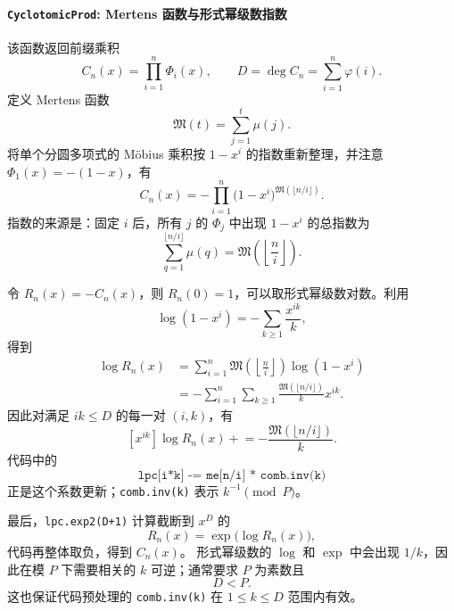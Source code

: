 \paragraph*{\texttt{CyclotomicProd}: Mertens 函数与形式幂级数指数}

该函数返回前缀乘积
\[
C_n(x)=\prod_{i=1}^{n}\Phi_i(x),
\qquad
D=\deg C_n=\sum_{i=1}^{n}\varphi(i).
\]
定义 Mertens 函数
\[
\mathfrak M(t)=\sum_{j=1}^{t}\mu(j).
\]
将单个分圆多项式的 Möbius 乘积按 $1-x^i$ 的指数重新整理，并注意 $\Phi_1(x)=-(1-x)$，有
\[
\boxed{
C_n(x)=-\prod_{i=1}^{n}
\bigl(1-x^i\bigr)^{\mathfrak M(\lfloor n/i\rfloor)}
}.
\]
指数的来源是：固定 $i$ 后，所有 $j$ 的 $\Phi_j$ 中出现 $1-x^i$ 的总指数为
\[
\sum_{q=1}^{\lfloor n/i\rfloor}\mu(q)
=\mathfrak M\!\left(\left\lfloor\frac ni\right\rfloor\right).
\]

令 $R_n(x)=-C_n(x)$，则 $R_n(0)=1$，可以取形式幂级数对数。利用
\[
\log(1-x^i)=-\sum_{k\geq 1}\frac{x^{ik}}k,
\]
得到
\[
\begin{aligned}
\log R_n(x)
&=\sum_{i=1}^{n}\mathfrak M\!\left(\left\lfloor\frac ni\right\rfloor\right)\log(1-x^i)\\
&=-\sum_{i=1}^{n}\sum_{k\geq 1}
\frac{\mathfrak M(\lfloor n/i\rfloor)}{k}x^{ik}.
\end{aligned}
\]
因此对满足 $ik\leq D$ 的每一对 $(i,k)$，有
\[
[x^{ik}]\log R_n(x)
\mathrel{+}= -\frac{\mathfrak M(\lfloor n/i\rfloor)}k.
\]
代码中的
\[
\texttt{lpc[i*k] -= me[n/i] * comb.inv(k)}
\]
正是这个系数更新；\texttt{comb.inv(k)} 表示 $k^{-1}\pmod P$。

最后，\texttt{lpc.exp2(D+1)} 计算截断到 $x^D$ 的
\[
R_n(x)=\exp\bigl(\log R_n(x)\bigr),
\]
代码再整体取负，得到 $C_n(x)$。
形式幂级数的 $\log$ 和 $\exp$ 中会出现 $1/k$，因此在模 $P$ 下需要相关的 $k$ 可逆；通常要求 $P$ 为素数且
\[
D<P.
\]
这也保证代码预处理的 \texttt{comb.inv(k)} 在 $1\leq k\leq D$ 范围内有效。

